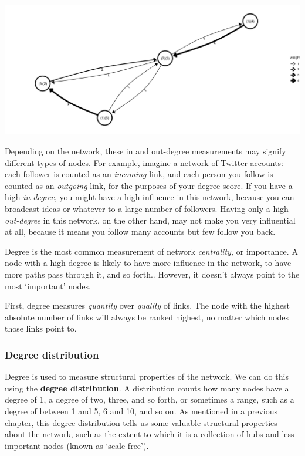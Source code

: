 \documentclass[
]{book}
\begin{document}
\includegraphics{images/degree.png}

Depending on the network, these in and out-degree measurements may signify different types of nodes. For example, imagine a network of Twitter accounts: each follower is counted as an \emph{incoming} link, and each person you follow is counted as an \emph{outgoing} link, for the purposes of your degree score. If you have a high \emph{in-degree}, you might have a high influence in this network, because you can broadcast ideas or whatever to a large number of followers. Having only a high \emph{out-degree} in this network, on the other hand, may not make you very influential at all, because it means you follow many accounts but few follow you back.

Degree is the most common measurement of network \emph{centrality,} or importance. A node with a high degree is likely to have more influence in the network, to have more paths pass through it, and so forth.. However, it doesn't always point to the most `important' nodes.

First, degree measures \emph{quantity} over \emph{quality} of links. The node with the highest absolute number of links will always be ranked highest, no matter which nodes those links point to.

\hypertarget{degree-distribution}{%
\subsubsection{Degree distribution}\label{degree-distribution}}

Degree is used to measure structural properties of the network. We can do this using the \textbf{degree distribution}. A distribution counts how many nodes have a degree of 1, a degree of two, three, and so forth, or sometimes a range, such as a degree of between 1 and 5, 6 and 10, and so on. As mentioned in a previous chapter, this degree distribution tells us some valuable structural properties about the network, such as the extent to which it is a collection of hubs and less important nodes (known as `scale-free').
\end{document}
